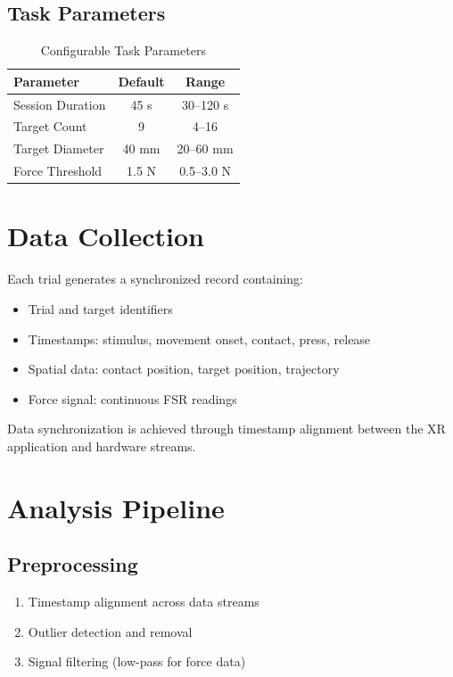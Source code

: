 \documentclass[11pt,twocolumn]{article}
\begin{document}
\subsection{Task Parameters}

\begin{table}[H]
\centering
\caption{Configurable Task Parameters}
\begin{tabular}{lcc}
\toprule
\textbf{Parameter} & \textbf{Default} & \textbf{Range} \\
\midrule
Session Duration & 45 s & 30--120 s \\
Target Count & 9 & 4--16 \\
Target Diameter & 40 mm & 20--60 mm \\
Force Threshold & 1.5 N & 0.5--3.0 N \\
\bottomrule
\end{tabular}
\label{tab:params}
\end{table}

\section{Data Collection}

Each trial generates a synchronized record containing:

\begin{itemize}
    \item Trial and target identifiers
    \item Timestamps: stimulus, movement onset, contact, press, release
    \item Spatial data: contact position, target position, trajectory
    \item Force signal: continuous FSR readings
\end{itemize}

Data synchronization is achieved through timestamp alignment between the XR application and hardware streams.

\section{Analysis Pipeline}

\subsection{Preprocessing}

\begin{enumerate}
    \item Timestamp alignment across data streams
    \item Outlier detection and removal
    \item Signal filtering (low-pass for force data)
\end{enumerate}
\end{document}
